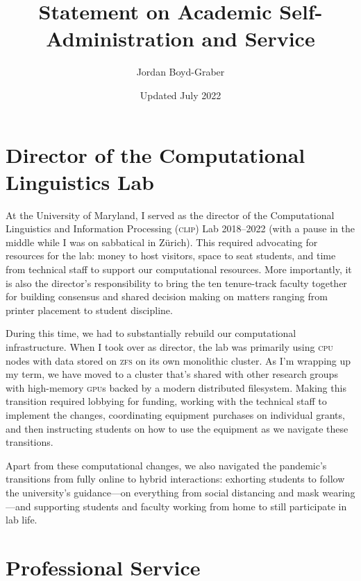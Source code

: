 \documentclass[11pt]{amsart}
\newcommand{\abr}[1]{\textsc{#1}}
\begin{document}
 \title{Statement on Academic Self-Administration and Service}

 \author{Jordan Boyd-Graber}
\address{University of Maryland}

\date{Updated July 2022}


\keywords{}

\maketitle

\section{Director of the Computational Linguistics Lab}

At the University of Maryland, I served as the director of the
Computational Linguistics and Information Processing (\abr{clip}) Lab
2018--2022 (with a pause in the middle while I was on sabbatical in
Z\"urich).
%
This required advocating for resources for the lab: money to host
visitors, space to seat students, and time from technical staff to
support our computational resources.
%
More importantly, it is also the director's responsibility to bring
the ten tenure-track faculty together for building consensus and shared
decision making on matters ranging from printer placement to student
discipline.

During this time, we had to substantially rebuild our computational
infrastructure.
%
When I took over as director, the lab was primarily using \abr{cpu}
nodes with data stored on \abr{zfs} on its own monolithic cluster.
%
As I'm wrapping up my term, we have moved to a cluster that's shared
with other research groups with high-memory \abr{gpu}s backed by a
modern distributed filesystem.
%
Making this transition required lobbying for funding, working with the
technical staff to implement the changes, coordinating equipment
purchases on individual grants, and then instructing students
on how to use the equipment as we navigate these transitions.

Apart from these computational changes, we also navigated the
pandemic's transitions from fully online to hybrid interactions:
exhorting students to follow the university's guidance---on everything
from social distancing and mask wearing---and supporting students and
faculty working from home to still participate in
lab life.

\section{Professional Service}
\end{document}
